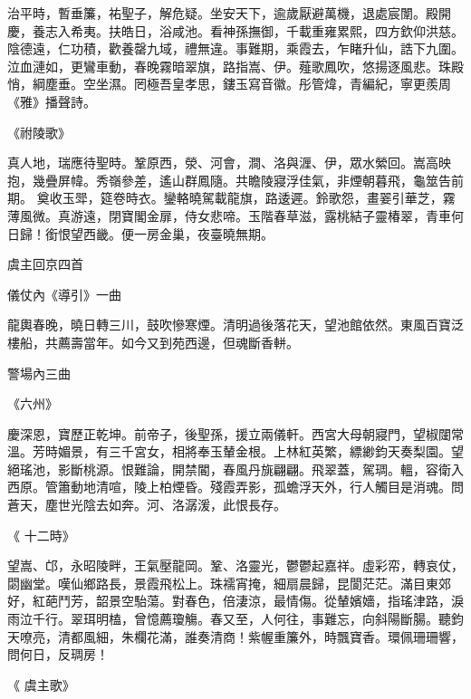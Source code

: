 \begin{pinyinscope}
 治平時，暫垂簾，祐聖子，解危疑。坐安天下，逾歲厭避萬機，退處宸闈。殿開慶，養志入希夷。扶皓日，浴咸池。看神孫撫御，千載重雍累熙，四方欽仰洪慈。
 陰德遠，仁功積，歡養罄九域，禮無違。事難期，乘霞去，乍睹升仙，誥下九圍。泣血漣如，更鸞車動，春晚霧暗翠旗，路指嵩、伊。薤歌鳳吹，悠揚逐風悲。珠殿悄，綱塵垂。空坐濕。罔極吾皇孝思，鏤玉寫音徽。彤管煒，青編紀，寧更羨周《雅》播聲詩。



 《祔陵歌》



 真人地，瑞應待聖時。鞏原西，滎、河會，澗、洛與湹、伊，眾水縈回。嵩高映抱，幾疊屏幃。秀嶺參差，遙山群鳳隨。共瞻陵寢浮佳氣，非煙朝暮飛，龜筮告前期。
 奠收玉斝，筵卷時衣。鑾輅曉駕載龍旗，路逶遲。鈴歌怨，畫翣引華芝，霧薄風微。真游遠，閉寶閣金扉，侍女悲啼。玉階春草滋，露桃結子靈椿翠，青車何日歸！銜恨望西畿。便一房金巢，夜臺曉無期。



 虞主回京四首



 儀仗內《導引》一曲



 龍輿春晚，曉日轉三川，鼓吹慘寒煙。清明過後落花天，望池館依然。東風百寶泛樓船，共薦壽當年。如今又到苑西邊，但魂斷香軿。



 警場內三曲



 《六州》



 慶深恩，寶歷正乾坤。前帝子，後聖孫，援立兩儀軒。西宮大母朝寢門，望椒闥常溫。芳時媚景，有三千宮女，相將奉玉輦金根。上林紅英繁，縹緲鈞天奏梨園。望絕瑤池，影斷桃源。恨難論，開禁閽，春風丹旐翩翩。飛翠蓋，駕琱。轀，容衛入西原。管簫動地清喧，陵上柏煙昏。殘霞弄影，孤蟾浮天外，行人觸目是消魂。問蒼天，塵世光陰去如奔。河、洛潺湲，此恨長存。



 《
 十二時》



 望嵩、邙，永昭陵畔，王氣壓龍岡。鞏、洛靈光，鬱鬱起嘉祥。虛彩帟，轉哀仗，閟幽堂。嘆仙鄉路長，景霞飛松上。珠襦宵掩，細扇晨歸，昆閬茫茫。滿目東郊好，紅葩鬥芳，韶景空駘蕩。對春色，倍淒涼，最情傷。從輦嬪嬙，指瑤津路，淚雨泣千行。翠珥明榼，曾憶薦瓊觴。春又至，人何往，事難忘，向斜陽斷腸。聽鈞天嘹亮，清都風細，朱欄花滿，誰奏清商！紫幄重簾外，時飄寶香。環佩珊珊響，問何日，反琱房！



 《
 虞主歌》




\end{pinyinscope}
